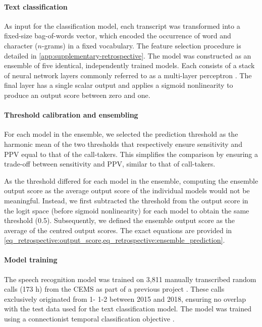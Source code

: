 {\paragraph{Text classification}

As input for the classification model, each transcript was transformed into a fixed-size bag-of-words vector, which encoded the occurrence of word and character ($n$-grams) in a fixed vocabulary. The feature selection procedure is detailed in \cref{app:supplementary-retrospective}. The model was constructed as an ensemble \parencite{hansen_neural_1990} of five identical, independently trained models. Each consists of a stack of neural network layers commonly referred to as a multi-layer perceptron \parencite{rosenblatt_perceptron_1958}. The final layer has a single scalar output and applies a sigmoid nonlinearity to produce an output score between zero and one.


\paragraph{Threshold calibration and ensembling}

For each model in the ensemble, we selected the prediction threshold as the harmonic mean of the two thresholds that respectively ensure sensitivity and PPV equal to that of the call-takers. This simplifies the comparison by ensuring a trade-off between sensitivity and PPV, similar to that of call-takers.

As the threshold differed for each model in the ensemble, computing the ensemble output score as the average output score of the individual models would not be meaningful. Instead, we first subtracted the threshold from the output score in the logit space (before sigmoid nonlinearity) for each model to obtain the same threshold (0.5). Subsequently, we defined the ensemble output score as the average of the centred output scores. The exact equations are provided in \cref{eq_retrospective:output_score,eq_retrospective:ensemble_prediction}.


\paragraph{Model training}

The speech recognition model was trained on 3,811 manually transcribed random calls (173 h) from the CEMS as part of a previous project \parencite{cite14}. These calls exclusively originated from 1- 1-2 between 2015 and 2018, ensuring no overlap with the test data used for the text classification model. The model was trained using a connectionist temporal classification objective \parencite{graves_connectionist_2006}.

}
